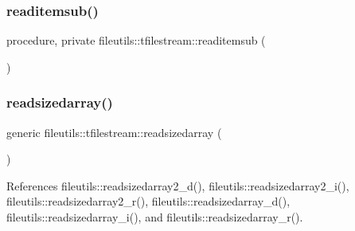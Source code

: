 \mbox{\label{structfileutils_1_1tfilestream_acb530785bf5834ad47798421c946632b}} 
\subsubsection{\texorpdfstring{readitemsub()}{readitemsub()}}
{\footnotesize\ttfamily procedure, private fileutils\+::tfilestream\+::readitemsub (\begin{DoxyParamCaption}{ }\end{DoxyParamCaption})\hspace{0.3cm}{\ttfamily [private]}}

\mbox{\label{structfileutils_1_1tfilestream_a0fe6ab4d7f178d8cdacb98806db99fdb}} 
\subsubsection{\texorpdfstring{readsizedarray()}{readsizedarray()}}
{\footnotesize\ttfamily generic fileutils\+::tfilestream\+::readsizedarray (\begin{DoxyParamCaption}{ }\end{DoxyParamCaption})\hspace{0.3cm}{\ttfamily [private]}}



References fileutils\+::readsizedarray2\+\_\+d(), fileutils\+::readsizedarray2\+\_\+i(), fileutils\+::readsizedarray2\+\_\+r(), fileutils\+::readsizedarray\+\_\+d(), fileutils\+::readsizedarray\+\_\+i(), and fileutils\+::readsizedarray\+\_\+r().

